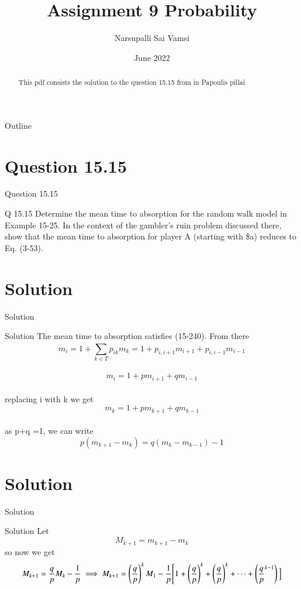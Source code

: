\documentclass{beamer}
\title{Assignment 9 Probability}
\author{Narsupalli Sai Vamsi}
\date{June 2022}
\begin{document}
\begin{frame}
\titlepage
 \begin{abstract}
     This pdf consists the solution to the question 15.15 from in Papoulis pillai
 \end{abstract}   
\end{frame}
\begin{frame}{Outline}
\tableofcontents
\end{frame}
\section{Question 15.15}
\begin{frame}{Question 15.15}
\begin{block}{Q 15.15}
Determine the mean time to absorption for the random walk model in Example 15-25. 
In the context of the gambler's ruin problem discussed there, show that the mean time to 
absorption for player A (starting with \$a) reduces to Eq. (3-53). 
\end{block}
\end{frame}
\section{Solution}
\begin{frame}{Solution}
\begin{block}{Solution}
The mean time to absorption satisfies (15-240). From there\\
$$m_i = 1+ \sum_{k\in T}^{}p_{ik}m_k = 1+ p_{i,i+1}m_{i+1}+p_{i,i-1}m_{i-1}$$\\
$$
m_i = 1 + pm_{i+1} +qm_{i-1}$$\\
replacing i with k we get\\
$$m_k = 1 + pm_{k+1} +qm_{k-1}$$\\
as p+q =1, we can write\\
$$p(m_{k+1}-m_{k})=q(m_k-m_{k-1}) - 1 $$
\end{block}
\end{frame}
\section{Solution}
\begin{frame}{Solution}
\begin{block}{Solution}
Let \\
$$ M_{k+1} = m_{k+1} - m_k$$
so now we get \\

$$  
M_{k+1} = \frac{q}{p}M_k - \frac{1}{p}\\
\implies M_{k+1}= \left({\frac{q}{p}}\right)^k M_1 - \frac{1}{p} \Bigg[1+ \left({\frac{q}{p}}\right)^k+ \left({\frac{q}{p}}\right)^k+ \dots +  \left({\frac{q}{p}}^{k-1}\right)\Big]
$$
\end{block}
\end{frame}
\end{document}

